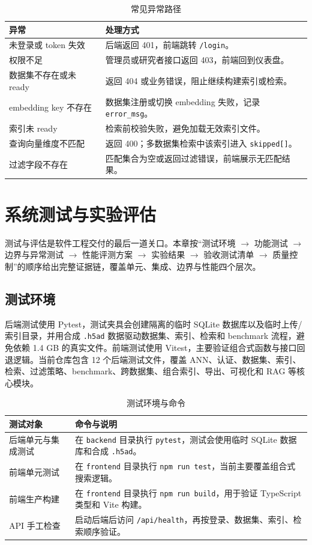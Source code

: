\documentclass[UTF8,a4paper,12pt]{ctexrep}
\begin{document}
\begin{table}[H]
  \centering
  \caption{常见异常路径}
  \begin{tabularx}{0.95\textwidth}{lY}
    \toprule
    异常 & 处理方式 \\
    \midrule
    未登录或 token 失效 & 后端返回 401，前端跳转 \texttt{/login}。 \\
    权限不足 & 管理员或研究者接口返回 403，前端回到仪表盘。 \\
    数据集不存在或未 ready & 返回 404 或业务错误，阻止继续构建索引或检索。 \\
    embedding key 不存在 & 数据集注册或切换 embedding 失败，记录 \texttt{error\_msg}。 \\
    索引未 ready & 检索前校验失败，避免加载无效索引文件。 \\
    查询向量维度不匹配 & 返回 400；多数据集检索中该索引进入 \texttt{skipped[]}。 \\
    过滤字段不存在 & 匹配集合为空或返回过滤错误，前端展示无匹配结果。 \\
    \bottomrule
  \end{tabularx}
\end{table}

\chapter{系统测试与实验评估}

测试与评估是软件工程交付的最后一道关口。本章按``测试环境 $\to$ 功能测试 $\to$ 边界与异常测试 $\to$ 性能评测方案 $\to$ 实验结果 $\to$ 验收测试清单 $\to$ 质量控制''的顺序给出完整证据链，覆盖单元、集成、边界与性能四个层次。

\section{测试环境}

后端测试使用 Pytest，测试夹具会创建隔离的临时 SQLite 数据库以及临时上传/索引目录，并用合成 \texttt{.h5ad} 数据驱动数据集、索引、检索和 benchmark 流程，避免依赖 1.4 GB 的真实文件。前端测试使用 Vitest，主要验证组合式函数与接口回退逻辑。当前仓库包含 12 个后端测试文件，覆盖 ANN、认证、数据集、索引、检索、过滤策略、benchmark、跨数据集、组合索引、导出、可视化和 RAG 等核心模块。

\begin{table}[H]
  \centering
  \caption{测试环境与命令}
  \begin{tabularx}{0.95\textwidth}{lY}
    \toprule
    测试对象 & 命令与说明 \\
    \midrule
    后端单元与集成测试 & 在 \texttt{backend} 目录执行 \texttt{pytest}，测试会使用临时 SQLite 数据库和合成 \texttt{.h5ad}。 \\
    前端单元测试 & 在 \texttt{frontend} 目录执行 \texttt{npm run test}，当前主要覆盖组合式搜索逻辑。 \\
    前端生产构建 & 在 \texttt{frontend} 目录执行 \texttt{npm run build}，用于验证 TypeScript 类型和 Vite 构建。 \\
    API 手工检查 & 启动后端后访问 \texttt{/api/health}，再按登录、数据集、索引、检索顺序验证。 \\
    \bottomrule
  \end{tabularx}
\end{table}
\end{document}
